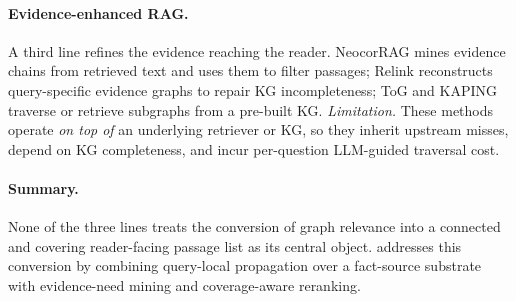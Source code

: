 \paragraph{Evidence-enhanced RAG.}
A third line refines the evidence reaching the reader.
NeocorRAG \citep{peng2026neocorrag} mines evidence chains from
retrieved text and uses them to filter passages; Relink
\citep{huang2026relink} reconstructs query-specific evidence graphs
to repair KG incompleteness; ToG \citep{sun2024tog} and
KAPING \citep{baek2023kaping} traverse or retrieve subgraphs from a
pre-built KG. \emph{Limitation.} These methods operate \emph{on top
of} an underlying retriever or KG, so they inherit upstream misses,
depend on KG completeness, and incur per-question LLM-guided
traversal cost.

\paragraph{Summary.}
None of the three lines treats the conversion of graph relevance
into a connected and covering reader-facing passage list as its
central object. \methodname{} addresses this conversion by
combining query-local propagation over a fact-source substrate
with evidence-need mining and coverage-aware reranking.
